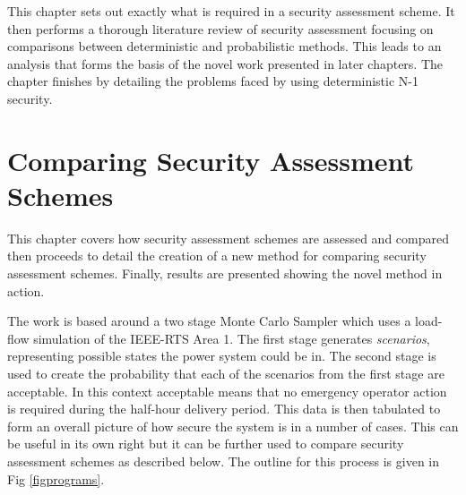 \documentclass[a4paper,oneside,12pt]{report}
\begin{document}
This chapter sets out exactly what is required in a security assessment scheme. It then performs a thorough literature review of security assessment focusing on comparisons between deterministic and probabilistic methods. This leads to an analysis that forms the basis of the novel work presented in later chapters. The chapter finishes by detailing the problems faced by using deterministic N-1 security.







\chapter{Comparing Security Assessment Schemes}\label{sec_compsas}

This chapter covers how security assessment schemes are assessed and compared then proceeds to detail the creation of a new method for comparing security assessment schemes. Finally, results are presented showing the novel method in action.

The work is based around a two stage Monte Carlo Sampler which uses a load-flow simulation of the IEEE-RTS Area 1. The first stage generates \emph{scenarios}, representing possible states the power system could be in. The second stage is used to create the probability that each of the scenarios from the first stage are acceptable. In this context acceptable means that no emergency operator action is required during the half-hour delivery period. This data is then tabulated to form an overall picture of how secure the system is in a number of cases. This can be useful in its own right but it can be further used to compare security assessment schemes as described below. The outline for this process is given in Fig \ref{figprograms}.
\end{document}
